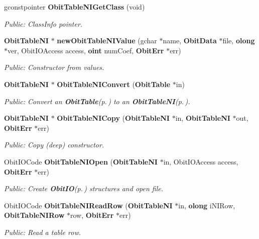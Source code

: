 \begin{CompactItemize}
gconstpointer {\bf Obit\-Table\-NIGet\-Class} (void)
\begin{CompactList}\small\item\em Public: Class\-Info pointer. \item\end{CompactList}\item 
{\bf Obit\-Table\-NI} $\ast$ {\bf new\-Obit\-Table\-NIValue} (gchar $\ast$name, {\bf Obit\-Data} $\ast$file, {\bf olong} $\ast$ver, Obit\-IOAccess access, {\bf oint} num\-Coef, {\bf Obit\-Err} $\ast$err)
\begin{CompactList}\small\item\em Public: Constructor from values. \item\end{CompactList}\item 
{\bf Obit\-Table\-NI} $\ast$ {\bf Obit\-Table\-NIConvert} ({\bf Obit\-Table} $\ast$in)
\begin{CompactList}\small\item\em Public: Convert an {\bf Obit\-Table}{\rm (p.\,\pageref{structObitTable})} to an {\bf Obit\-Table\-NI}{\rm (p.\,\pageref{structObitTableNI})}. \item\end{CompactList}\item 
{\bf Obit\-Table\-NI} $\ast$ {\bf Obit\-Table\-NICopy} ({\bf Obit\-Table\-NI} $\ast$in, {\bf Obit\-Table\-NI} $\ast$out, {\bf Obit\-Err} $\ast$err)
\begin{CompactList}\small\item\em Public: Copy (deep) constructor. \item\end{CompactList}\item 
Obit\-IOCode {\bf Obit\-Table\-NIOpen} ({\bf Obit\-Table\-NI} $\ast$in, Obit\-IOAccess access, {\bf Obit\-Err} $\ast$err)
\begin{CompactList}\small\item\em Public: Create {\bf Obit\-IO}{\rm (p.\,\pageref{structObitIO})} structures and open file. \item\end{CompactList}\item 
Obit\-IOCode {\bf Obit\-Table\-NIRead\-Row} ({\bf Obit\-Table\-NI} $\ast$in, {\bf olong} i\-NIRow, {\bf Obit\-Table\-NIRow} $\ast$row, {\bf Obit\-Err} $\ast$err)
\begin{CompactList}\small\item\em Public: Read a table row. \item\end{CompactList}\item 

\end{CompactItemize}
